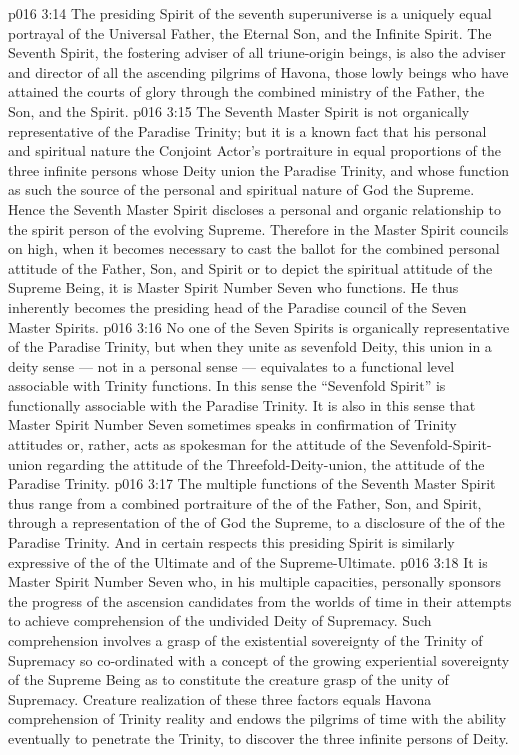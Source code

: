 \vs p016 3:14 \pc {} The presiding Spirit of the seventh superuniverse is a uniquely equal portrayal of the Universal Father, the Eternal Son, and the Infinite Spirit. The Seventh Spirit, the fostering adviser of all triune\hyp{}origin beings, is also the adviser and director of all the ascending pilgrims of Havona, those lowly beings who have attained the courts of glory through the combined ministry of the Father, the Son, and the Spirit.
\vs p016 3:15 The Seventh Master Spirit is not organically representative of the Paradise Trinity; but it is a known fact that his personal and spiritual nature  the Conjoint Actor’s portraiture in equal proportions of the three infinite persons whose Deity union  the Paradise Trinity, and whose function as such  the source of the personal and spiritual nature of God the Supreme. Hence the Seventh Master Spirit discloses a personal and organic relationship to the spirit person of the evolving Supreme. Therefore in the Master Spirit councils on high, when it becomes necessary to cast the ballot for the combined personal attitude of the Father, Son, and Spirit or to depict the spiritual attitude of the Supreme Being, it is Master Spirit Number Seven who functions. He thus inherently becomes the presiding head of the Paradise council of the Seven Master Spirits.
\vs p016 3:16 No one of the Seven Spirits is organically representative of the Paradise Trinity, but when they unite as sevenfold Deity, this union in a deity sense --- not in a personal sense --- equivalates to a functional level associable with Trinity functions. In this sense the “Sevenfold Spirit” is functionally associable with the Paradise Trinity. It is also in this sense that Master Spirit Number Seven sometimes speaks in confirmation of Trinity attitudes or, rather, acts as spokesman for the attitude of the Sevenfold\hyp{}Spirit\hyp{}union regarding the attitude of the Threefold\hyp{}Deity\hyp{}union, the attitude of the Paradise Trinity.
\vs p016 3:17 The multiple functions of the Seventh Master Spirit thus range from a combined portraiture of the  of the Father, Son, and Spirit, through a representation of the  of God the Supreme, to a disclosure of the  of the Paradise Trinity. And in certain respects this presiding Spirit is similarly expressive of the  of the Ultimate and of the Supreme\hyp{}Ultimate.
\vs p016 3:18 It is Master Spirit Number Seven who, in his multiple capacities, personally sponsors the progress of the ascension candidates from the worlds of time in their attempts to achieve comprehension of the undivided Deity of Supremacy. Such comprehension involves a grasp of the existential sovereignty of the Trinity of Supremacy so co\hyp{}ordinated with a concept of the growing experiential sovereignty of the Supreme Being as to constitute the creature grasp of the unity of Supremacy. Creature realization of these three factors equals Havona comprehension of Trinity reality and endows the pilgrims of time with the ability eventually to penetrate the Trinity, to discover the three infinite persons of Deity.
